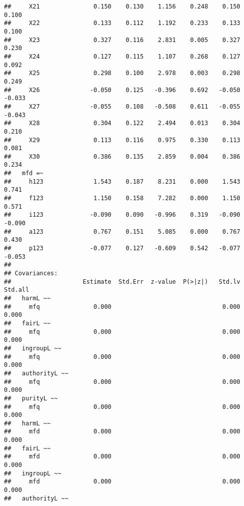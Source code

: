 \documentclass[english,man]{apa6}
\newcounter{author}
\theoremstyle{definition}
\theoremstyle{definition}
\theoremstyle{definition}
\theoremstyle{remark}
\begin{document}
\begin{verbatim}
##     X21               0.150    0.130    1.156    0.248    0.150    0.100
##     X22               0.133    0.112    1.192    0.233    0.133    0.100
##     X23               0.327    0.116    2.831    0.005    0.327    0.230
##     X24               0.127    0.115    1.107    0.268    0.127    0.092
##     X25               0.298    0.100    2.978    0.003    0.298    0.249
##     X26              -0.050    0.125   -0.396    0.692   -0.050   -0.033
##     X27              -0.055    0.108   -0.508    0.611   -0.055   -0.043
##     X28               0.304    0.122    2.494    0.013    0.304    0.210
##     X29               0.113    0.116    0.975    0.330    0.113    0.081
##     X30               0.386    0.135    2.859    0.004    0.386    0.234
##   mfd =~                                                                
##     h123              1.543    0.187    8.231    0.000    1.543    0.741
##     f123              1.150    0.158    7.282    0.000    1.150    0.571
##     i123             -0.090    0.090   -0.996    0.319   -0.090   -0.090
##     a123              0.767    0.151    5.085    0.000    0.767    0.430
##     p123             -0.077    0.127   -0.609    0.542   -0.077   -0.053
## 
## Covariances:
##                    Estimate  Std.Err  z-value  P(>|z|)   Std.lv  Std.all
##   harmL ~~                                                              
##     mfq               0.000                               0.000    0.000
##   fairL ~~                                                              
##     mfq               0.000                               0.000    0.000
##   ingroupL ~~                                                           
##     mfq               0.000                               0.000    0.000
##   authorityL ~~                                                         
##     mfq               0.000                               0.000    0.000
##   purityL ~~                                                            
##     mfq               0.000                               0.000    0.000
##   harmL ~~                                                              
##     mfd               0.000                               0.000    0.000
##   fairL ~~                                                              
##     mfd               0.000                               0.000    0.000
##   ingroupL ~~                                                           
##     mfd               0.000                               0.000    0.000
##   authorityL ~~                                                         

\end{verbatim}
\end{document}
